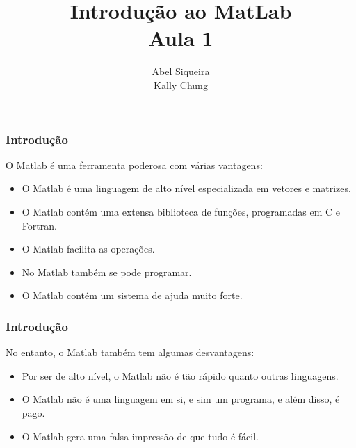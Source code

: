 \documentclass{beamer}
\title{Introdu\c{c}\~ao ao MatLab \\ Aula 1}
\author{Abel Siqueira \\ Kally Chung}
\date{}
\begin{document}
\frame{\titlepage}

\section[Introdu\c{c}\~ao]{}
\frame
{
  \frametitle{Introdu\c{c}\~ao}

  O Matlab \'e uma ferramenta poderosa com v\'arias vantagens:

  \begin{itemize}
  \item<2-> O Matlab \'e uma linguagem de alto n\'ivel especializada em vetores e matrizes.
  \item<3-> O Matlab cont\'em uma extensa biblioteca de fun\c{c}\~oes, programadas em C e Fortran.
  \item<4-> O Matlab facilita as opera\c{c}\~oes.
  \item<5-> No Matlab tamb\'em se pode programar.
  \item<6-> O Matlab cont\'em um sistema de ajuda muito forte.
  \end{itemize}
}
\frame
{
  \frametitle{Introdu\c{c}\~ao}

  No entanto, o Matlab tamb\'em tem algumas desvantagens:

  \begin{itemize}
  \item<2-> Por ser de alto n\'ivel, o Matlab n\~ao \'e t\~ao r\'apido quanto outras linguagens.
  \item<3-> O Matlab n\~ao \'e uma linguagem em si, e sim um programa, e al\'em disso, \'e pago.
  \item<4-> O Matlab gera uma falsa impress\~ao de que tudo \'e f\'acil.
  \end{itemize}

}
\end{document}
